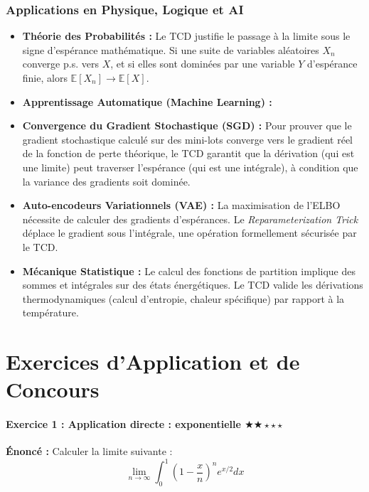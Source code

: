 \documentclass[11pt,a4paper]{article}
\begin{document}
\section{Applications en Physique, Logique et AI}

\begin{itemize}
\item \textbf{Théorie des Probabilités :} Le TCD justifie le passage à la limite sous le signe d'espérance mathématique. Si une suite de variables aléatoires $X_n$ converge p.s. vers $X$, et si elles sont dominées par une variable $Y$ d'espérance finie, alors $\mathbb{E}[X_n] \to \mathbb{E}[X]$.
\item \textbf{Apprentissage Automatique (Machine Learning) :}
\item \textbf{Convergence du Gradient Stochastique (SGD) :} Pour prouver que le gradient stochastique calculé sur des mini-lots converge vers le gradient réel de la fonction de perte théorique, le TCD garantit que la dérivation (qui est une limite) peut traverser l'espérance (qui est une intégrale), à condition que la variance des gradients soit dominée.
\item \textbf{Auto-encodeurs Variationnels (VAE) :} La maximisation de l'ELBO nécessite de calculer des gradients d'espérances. Le \textit{Reparameterization Trick} déplace le gradient sous l'intégrale, une opération formellement sécurisée par le TCD.
\item \textbf{Mécanique Statistique :} Le calcul des fonctions de partition implique des sommes et intégrales sur des états énergétiques. Le TCD valide les dérivations thermodynamiques (calcul d'entropie, chaleur spécifique) par rapport à la température.

\end{itemize}

\newpage
\part{Exercices d'Application et de Concours}
\subsection*{Exercice 1 : Application directe : exponentielle \quad $\bigstar\bigstar\star\star\star$}

\textbf{Énoncé :}
Calculer la limite suivante :
$$ \lim_{n \to \infty} \int_0^{1} \left(1 - \frac{x}{n}\right)^n e^{x/2} dx $$
\end{document}
